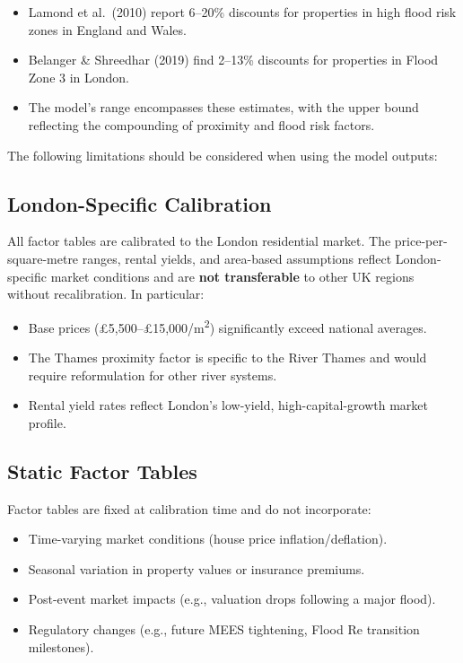 \documentclass[11pt,a4paper]{article}
\begin{document}
\begin{itemize}
    \item Lamond et al.\ (2010) report 6--20\% discounts for properties
          in high flood risk zones in England and Wales.
    \item Belanger \& Shreedhar (2019) find 2--13\% discounts for
          properties in Flood Zone 3 in London.
    \item The model's range encompasses these estimates, with the upper
          bound reflecting the compounding of proximity and flood risk
          factors.
\end{itemize}


\mkmlimitations

The following limitations should be considered when using the model outputs:

\subsection{London-Specific Calibration}

All factor tables are calibrated to the London residential market. The
price-per-square-metre ranges, rental yields, and area-based assumptions
reflect London-specific market conditions and are \textbf{not transferable}
to other UK regions without recalibration. In particular:

\begin{itemize}
    \item Base prices (\pounds5,500--\pounds15,000/m\textsuperscript{2})
          significantly exceed national averages.
    \item The Thames proximity factor is specific to the River Thames and
          would require reformulation for other river systems.
    \item Rental yield rates reflect London's low-yield, high-capital-growth
          market profile.
\end{itemize}

\subsection{Static Factor Tables}

Factor tables are fixed at calibration time and do not incorporate:

\begin{itemize}
    \item Time-varying market conditions (house price inflation/deflation).
    \item Seasonal variation in property values or insurance premiums.
    \item Post-event market impacts (e.g., valuation drops following a
          major flood).
    \item Regulatory changes (e.g., future MEES tightening, Flood Re
          transition milestones).
\end{itemize}
\end{document}
